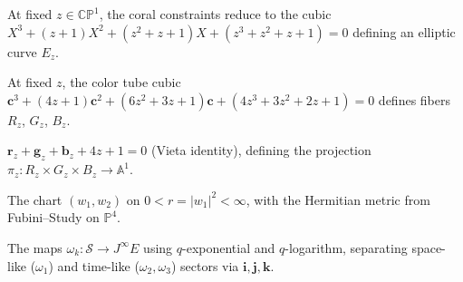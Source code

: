 \begin{proposition}
  \label{prop:coral-elliptic}
  At fixed $z \in \mathbb{CP}^1$, the coral constraints reduce
  to the cubic $X^3 + (z+1)X^2 + (z^2+z+1)X + (z^3+z^2+z+1) = 0$
  defining an elliptic curve $E_z$.
\end{proposition}

\begin{definition}
  \label{def:color-tube-fibers}
  At fixed $z$, the color tube cubic
  $\mathbf{c}^3 + (4z+1)\mathbf{c}^2 + (6z^2+3z+1)\mathbf{c}
  + (4z^3+3z^2+2z+1) = 0$ defines fibers $R_z$, $G_z$, $B_z$.
\end{definition}

\begin{definition}
  \label{def:observed-value}
  $\mathbf{r}_z + \mathbf{g}_z + \mathbf{b}_z + 4z + 1 = 0$
  (Vieta identity), defining the projection
  $\pi_z : R_z \times G_z \times B_z \to \mathbb{A}^1$.
\end{definition}

\begin{definition}
  \label{def:briggs-klein-chart}
  The chart $(w_1, w_2)$ on $0 < r = |w_1|^2 < \infty$, with
  the Hermitian metric from Fubini--Study on $\mathbb{P}^4$.
\end{definition}

\begin{definition}
  \label{def:quaternionic-spectral-resolvents}
  The maps $\omega_k : \mathcal{S} \to J^\infty E$ using
  $q$-exponential and $q$-logarithm, separating space-like ($\omega_1$)
  and time-like ($\omega_2, \omega_3$) sectors via $\mathbf{i}, \mathbf{j}, \mathbf{k}$.
\end{definition}

